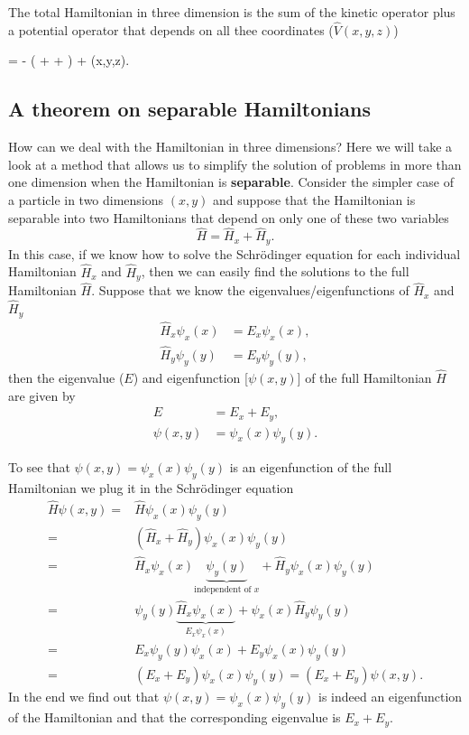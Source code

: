 \documentclass[../Main/chem331-notes.tex]{subfiles}
\begin{document}
The total Hamiltonian in three dimension is the sum of the kinetic operator plus a potential operator that depends on all thee coordinates ($\hat{V}(x,y,z)$)
\begin{iequation}
 = -
\left( +  +  \right) + (x,y,z).
\end{iequation}

\subsection{A theorem on separable Hamiltonians}
How can we deal with the Hamiltonian in three dimensions?
Here we will take a look at a method that allows us to simplify the solution of problems in more than one dimension when the Hamiltonian is \textbf{separable}.
Consider the simpler case of a particle in two dimensions $(x,y)$ and suppose that the Hamiltonian is separable into two Hamiltonians that depend on only one of these two variables
\begin{equation}
\hat{H} = \hat{H}_x + \hat{H}_y. 
\end{equation}
In this case, if we know how to solve the Schr\"{o}dinger equation for each individual Hamiltonian $\hat{H}_x$ and $\hat{H}_y$, then we can easily find the solutions to the full Hamiltonian $\hat{H}$.
Suppose that we know the eigenvalues/eigenfunctions of $\hat{H}_x$ and $\hat{H}_y$
\begin{align}
\hat{H}_x \psi_x(x) &= E_x \psi_x(x), \\
\hat{H}_y \psi_y(y) &= E_y \psi_y(y),
\end{align}
then the eigenvalue ($E$) and eigenfunction [$\psi(x,y)$] of the full Hamiltonian $\hat{H}$ are given by
\begin{align}
E &= E_x + E_y, \\
\psi(x,y) &= \psi_x(x) \psi_y(y).
\end{align}

To see that $\psi(x,y) = \psi_x(x) \psi_y(y)$ is an eigenfunction of the full Hamiltonian we plug it in the Schr\"{o}dinger equation
\begin{equation}
\begin{split}
\hat{H} \psi(x,y) =& \hat{H}  \psi_x(x) \psi_y(y) \\
 =& (\hat{H}_x + \hat{H}_y)\psi_x(x) \psi_y(y) \\
=& \hat{H}_x\psi_x(x) \underbrace{\psi_y(y)}_{\text{independent of } x} + \hat{H}_y\psi_x(x) \psi_y(y) \\
=& \psi_y(y) \underbrace{\hat{H}_x\psi_x(x)}_{E_x\psi_x(x)} + \psi_x(x) \hat{H}_y \psi_y(y) \\
=& E_x \psi_y(y)\psi_x(x) + E_y \psi_x(x)  \psi_y(y) \\
=& (E_x + E_y) \psi_x(x)  \psi_y(y) = (E_x + E_y) \psi(x,y).
\end{split}
\end{equation}
In the end we find out that $\psi(x,y) = \psi_x(x) \psi_y(y)$ is indeed an eigenfunction of the Hamiltonian and that the corresponding eigenvalue is $E_x + E_y$.
\end{document}

